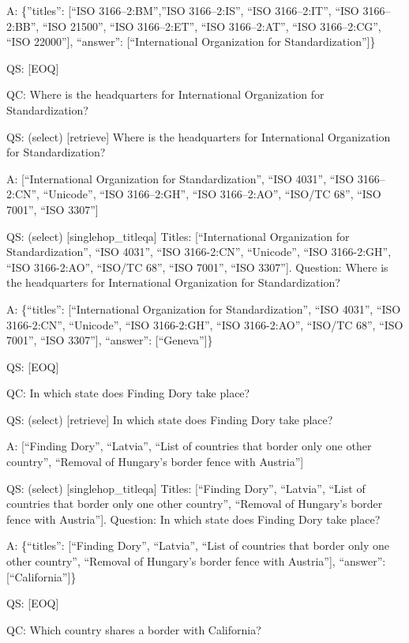 \documentclass[
]{article}
\begin{document}
A: \{''titles'': {[}``ISO 3166--2:BM'',''ISO 3166--2:IS'', ``ISO
3166--2:IT'', ``ISO 3166--2:BB'', ``ISO 21500'', ``ISO 3166--2:ET'',
``ISO 3166--2:AT'', ``ISO 3166--2:CG'', ``ISO 22000''{]}, ``answer'':
{[}``International Organization for Standardization''{]}\}

QS: {[}EOQ{]}

QC: Where is the headquarters for International Organization for
Standardization?

QS: (select) {[}retrieve{]} Where is the headquarters for International
Organization for Standardization?

A: {[}``International Organization for Standardization'', ``ISO 4031'',
``ISO 3166--2:CN'', ``Unicode'', ``ISO 3166--2:GH'', ``ISO 3166--2:AO'',
``ISO/TC 68'', ``ISO 7001'', ``ISO 3307''{]}

QS: (select) {[}singlehop\_titleqa{]} Titles: {[}``International
Organization for Standardization'', ``ISO 4031'', ``ISO 3166-2:CN'',
``Unicode'', ``ISO 3166-2:GH'', ``ISO 3166-2:AO'', ``ISO/TC 68'', ``ISO
7001'', ``ISO 3307''{]}. Question: Where is the headquarters for
International Organization for Standardization?

A: \{``titles'': {[}``International Organization for Standardization'',
``ISO 4031'', ``ISO 3166-2:CN'', ``Unicode'', ``ISO 3166-2:GH'', ``ISO
3166-2:AO'', ``ISO/TC 68'', ``ISO 7001'', ``ISO 3307''{]}, ``answer'':
{[}``Geneva''{]}\}

QS: {[}EOQ{]}

QC: In which state does Finding Dory take place?

QS: (select) {[}retrieve{]} In which state does Finding Dory take place?

A: {[}``Finding Dory'', ``Latvia'', ``List of countries that border only
one other country'', ``Removal of Hungary's border fence with
Austria''{]}

QS: (select) {[}singlehop\_titleqa{]} Titles: {[}``Finding Dory'',
``Latvia'', ``List of countries that border only one other country'',
``Removal of Hungary's border fence with Austria''{]}. Question: In
which state does Finding Dory take place?

A: \{``titles'': {[}``Finding Dory'', ``Latvia'', ``List of countries
that border only one other country'', ``Removal of Hungary's border
fence with Austria''{]}, ``answer'': {[}``California''{]}\}

QS: {[}EOQ{]}

QC: Which country shares a border with California?
\end{document}
